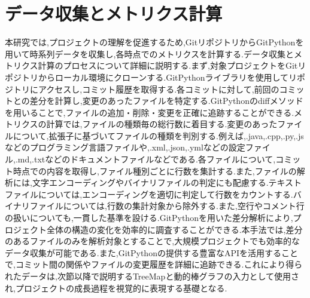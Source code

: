 \documentclass[12pt,twoside]{jbook}
\begin{document}
\section{データ収集とメトリクス計算}
本研究では,プロジェクトの理解を促進するため,GitリポジトリからGitPythonを用いて時系列データを収集し,各時点でのメトリクスを計算する.データ収集とメトリクス計算のプロセスについて詳細に説明する.まず,対象プロジェクトをGitリポジトリからローカル環境にクローンする.GitPythonライブラリを使用してリポジトリにアクセスし,コミット履歴を取得する.各コミットに対して,前回のコミットとの差分を計算し,変更のあったファイルを特定する.GitPythonのdiffメソッドを用いることで,ファイルの追加・削除・変更を正確に追跡することができる.メトリクスの計算では,ファイルの種類毎の総行数に着目する.変更のあったファイルについて,拡張子に基づいてファイルの種類を判別する.例えば,.java,.cpp,.py,.jsなどのプログラミング言語ファイルや,.xml,.json,.ymlなどの設定ファイル,.md,.txtなどのドキュメントファイルなどである.各ファイルについて,コミット時点での内容を取得し,ファイル種別ごとに行数を集計する.また,ファイルの解析には,文字エンコーディングやバイナリファイルの判定にも配慮する.テキストファイルについては,エンコーディングを適切に判定して行数をカウントする.バイナリファイルについては,行数の集計対象から除外する.また,空行やコメント行の扱いについても,一貫した基準を設ける.GitPythonを用いた差分解析により,プロジェクト全体の構造の変化を効率的に調査することができる.本手法では,差分のあるファイルのみを解析対象とすることで,大規模プロジェクトでも効率的なデータ収集が可能である.また,GitPythonの提供する豊富なAPIを活用することで,コミット間の関係やファイルの変更履歴を詳細に追跡できる.これにより得られたデータは,次節以降で説明するTreeMapと動的棒グラフの入力として使用され,プロジェクトの成長過程を視覚的に表現する基礎となる.
\end{document}
